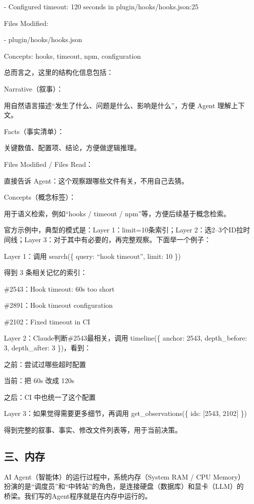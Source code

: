 - Configured timeout: 120 seconds in plugin/hooks/hooks.json:25

Files Modified:

- plugin/hooks/hooks.json

Concepts: hooks, timeout, npm, configuration

总而言之，这里的结构化信息包括：

Narrative（叙事）：

用自然语言描述``发生了什么、问题是什么、影响是什么''，方便 Agent 理解上下文。

Facts（事实清单）：

关键数值、配置项、结论，方便做逻辑推理。

Files Modified / Files Read：

直接告诉 Agent：这个观察跟哪些文件有关，不用自己去猜。

Concepts（概念标签）：

用于语义检索，例如``hooks / timeout / npm''等，方便后续基于概念检索。

官方示例中，典型的模式是：Layer 1：limit=10条索引；Layer 2：选2--3个ID拉时间线；Layer 3：对于其中有必要的，再完整观察。下面举一个例子：

Layer 1：调用 search(\{ query: ``hook timeout'', limit: 10 \})

得到 3 条相关记忆的索引：

\#2543：Hook timeout: 60s too short

\#2891：Hook timeout configuration

\#2102：Fixed timeout in CI

Layer 2：Claude判断\#2543最相关，调用 timeline(\{ anchor: 2543, depth\_before: 3, depth\_after: 3 \})，看到：

之前：尝试过哪些超时配置

当前：把 60s 改成 120s

之后：CI 中也统一了这个配置

Layer 3：如果觉得需要更多细节，再调用 get\_observations(\{ ids: {[}2543, 2102{]} \})

得到完整的叙事、事实、修改文件列表等，用于当前决策。

\hypertarget{ux4e09ux5185ux5b58}{%
\subsection{三、内存}\label{ux4e09ux5185ux5b58}}

AI Agent（智能体）的运行过程中，系统内存（System RAM / CPU Memory）扮演的是``调度员''和``中转站''的角色，是连接硬盘（数据库）和显卡（LLM）的桥梁。我们写的Agent程序就是在内存中运行的。

